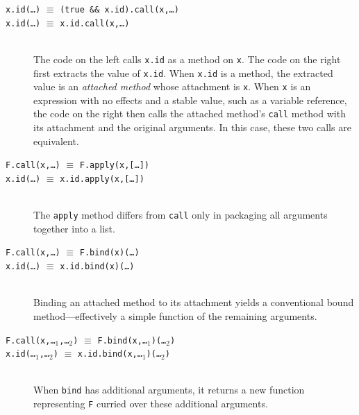 \documentclass[letterpaper,twocolumn,10pt]{article}
\newcommand{\code}[1]{{\tt {#1}}}              %
\begin{document}
\begin{description}

  \item[\code{x.id(\ldots)} $\equiv$ \code{(true \&\& x.id).call(x,\ldots)}]
  
  \item[\code{x.id(\ldots)} $\equiv$ \code{x.id.call(x,\ldots)}]
  
  \ \\
  The code on the left calls \code{x.id} as a method on \code{x}. The code on 
  the right first extracts the value of \code{x.id}. When \code{x.id} is a 
  method, the extracted value is an \emph{attached method} whose attachment 
  is \code{x}. When \code{x} is an expression with no effects and a stable 
  value, such as a variable reference, the code on the right then calls the 
  attached method's \code{call} method with its attachment and the original 
  arguments. In this case, these two calls are equivalent.
  
  \item[\code{F.call(x,\ldots)} $\equiv$ \code{F.apply(x,[\ldots])}]
  \item[\code{x.id(\ldots)} $\equiv$ \code{x.id.apply(x,[\ldots])}]
  
  \ \\
  The \code{apply} method differs from \code{call} only in packaging all 
  arguments together into a list.
  
  \item[\code{F.call(x,\ldots)} $\equiv$ \code{F.bind(x)(\ldots)}]
  \item[\code{x.id(\ldots)} $\equiv$ \code{x.id.bind(x)(\ldots)}]
    
  \ \\
  Binding an attached method to its attachment yields a conventional bound 
  method---effectively a simple function of the remaining arguments.
  
  \item[\code{F.call(x,\ldots$_1$,\ldots$_2$)} $\equiv$ 
  \code{F.bind(x,\ldots$_1$)(\ldots$_2$)}]
  \item[\code{x.id(\ldots$_1$,\ldots$_2$)} $\equiv$ 
  \code{x.id.bind(x,\ldots$_1$)(\ldots$_2$)}]

  \ \\
  When \code{bind} has additional arguments, it returns a new function 
  representing \code{F} curried over these additional arguments.
  
\end{description}
\end{document}
